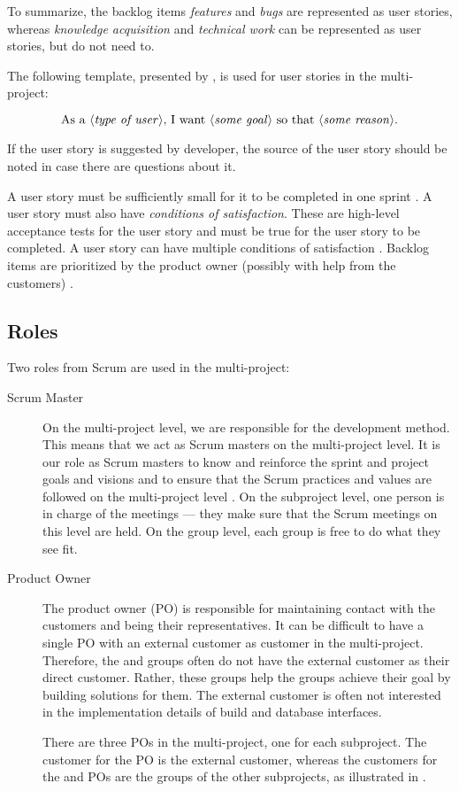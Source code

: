 To summarize, the backlog items \emph{features} and \emph{bugs} are represented as user stories, whereas \emph{knowledge acquisition} and \emph{technical work} can be represented as user stories, but do not need to.

The following template, presented by \textcite{cohn2009}, is used for user stories in the multi-project:

$$\text{As a $\langle{}$\emph{type of user}$\rangle{}$, I want $\langle{}$\emph{some goal}$\rangle{}$ so that $\langle{}$\emph{some reason}$\rangle{}$}.$$

If the user story is suggested by developer, the source of the user story should be noted in case there are questions about it.

A user story must be sufficiently small for it to be completed in one sprint \parencite{cohn2009}. A user story must also have \emph{conditions of satisfaction}. These are high-level acceptance tests for the user story and must be true for the user story to be completed. A user story can have multiple conditions of satisfaction \cite{cohn2009}. Backlog items are prioritized by the product owner (possibly with help from the customers) \cite{larman2003}.


\subsection{Roles}
Two roles from Scrum are used in the multi-project:

\begin{description}
  \item[Scrum Master]  On the multi-project level, we are responsible for the development method. This means that we act as Scrum masters on the multi-project level. It is our role as Scrum masters to know and reinforce the sprint and project goals and visions and to ensure that the Scrum practices and values are followed on the multi-project level \cite{larman2003}. On the subproject level, one person is in charge of the meetings --- they make sure that the Scrum meetings on this level are held. On the group level, each group is free to do what they see fit.
  \item[Product Owner] The product owner (PO) is responsible for maintaining contact with the customers and being their representatives. It can be difficult to have a single PO with an external customer as customer in the multi-project. Therefore, the \bd and \db groups often do not have the external customer as their direct customer. Rather, these groups help the \gui groups achieve their goal by building solutions for them. The external customer is often not interested in the implementation details of build and database interfaces.

There are three POs in the multi-project, one for each subproject. The customer for the \gui PO is the external customer, whereas the customers for the \db and \bd POs are the groups of the other subprojects, as illustrated in .
\end{description}

